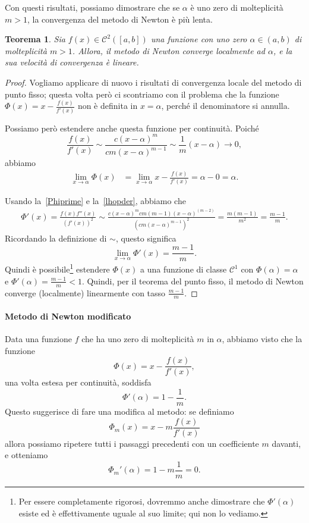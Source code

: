 \documentclass[a4paper]{report}
\newtheorem{theorem}{Teorema}[chapter]
\theoremstyle{definiton}
\theoremstyle{remark}
\begin{document}
Con questi risultati, possiamo dimostrare che se $\alpha$ è uno zero di molteplicità $m>1$, la convergenza del metodo di Newton è più lenta.
\begin{theorem}
    Sia $f(x) \in \mathcal{C}^2([a,b])$ una funzione con uno zero $\alpha \in (a,b)$ di molteplicità $m>1$.
    Allora, il metodo di Newton converge localmente ad $\alpha$, e la sua velocità di convergenza è lineare.
\end{theorem}
\begin{proof}
Vogliamo applicare di nuovo i risultati di convergenza locale del metodo di punto fisso; questa volta però ci scontriamo con il problema che la funzione $\Phi(x) = x - \frac{f(x)}{f'(x)}$ non è definita in $x=\alpha$, perché il denominatore si annulla.

Possiamo però estendere anche questa funzione per continuità. Poiché
\[
    \frac{f(x)}{f'(x)} \sim \frac{c(x-\alpha)^m}{cm(x-\alpha)^{m-1}} \sim \frac{1}{m}(x-\alpha) \to 0,
\]
abbiamo
\begin{align*}
    \lim_{x\to\alpha} \Phi(x) &= \lim_{x\to\alpha} x - \frac{f(x)}{f'(x)} = \alpha - 0 = \alpha.
\end{align*}

Usando la~\eqref{Phiprime} e la~\eqref{lhopder}, abbiamo che
\begin{align*}
    \Phi'(x) = \frac{f(x)f''(x)}{(f'(x))^2} \sim \frac{c(x-\alpha)^m cm(m-1)(x-\alpha)^{(m-2)}}{(cm(x-\alpha)^{m-1})^2} = 
    \frac{m(m-1)}{m^2} = \frac{m-1}{m}.
\end{align*}
Ricordando la definizione di $\sim$, questo significa
\[
    \lim_{x\to\alpha} \Phi'(x) = \frac{m-1}{m}.
\]
Quindi è possibile\footnote{Per essere completamente rigorosi, dovremmo anche dimostrare che $\Phi'(\alpha)$ esiste ed è effettivamente uguale al suo limite; qui non lo vediamo.} estendere $\Phi(x)$ a una funzione di classe $\mathcal{C}^1$ con $\Phi(\alpha)=\alpha$ e $\Phi'(\alpha) = \frac{m-1}{m} < 1$. Quindi, per il teorema del punto fisso, il metodo di Newton converge (localmente) linearmente con tasso $\frac{m-1}{m}$.
\end{proof}

\paragraph{Metodo di Newton modificato} Data una funzione $f$ che ha uno zero di molteplicità $m$ in $\alpha$, abbiamo visto che la funzione
\[
    \Phi(x) = x - \frac{f(x)}{f'(x)},
\]
una volta estesa per continuità, soddisfa
\[
    \Phi'(\alpha) = 1 - \frac{1}{m}.
\]
Questo suggerisce di fare una modifica al metodo: se definiamo
\[
    \Phi_m(x) = x - m \frac{f(x)}{f'(x)}
\]
allora possiamo ripetere tutti i passaggi precedenti con un coefficiente $m$ davanti, e otteniamo
\[
    \Phi_m'(\alpha) = 1 - m\frac{1}{m} = 0.
\]
\end{document}

